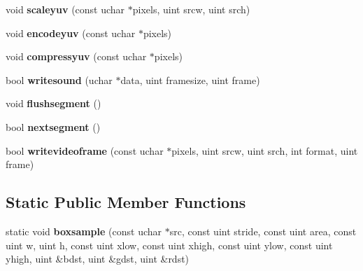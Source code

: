 \begin{DoxyCompactItemize}
\mbox{\label{structaviwriter_a031f24e197b329854736a38204544882}} 
void {\bfseries scaleyuv} (const uchar $\ast$pixels, uint srcw, uint srch)
\item 
\mbox{\label{structaviwriter_a8c2c0aed71f773b24e4eafa1e9420234}} 
void {\bfseries encodeyuv} (const uchar $\ast$pixels)
\item 
\mbox{\label{structaviwriter_adb2650291d6231a0c471a70aab343d13}} 
void {\bfseries compressyuv} (const uchar $\ast$pixels)
\item 
\mbox{\label{structaviwriter_a5b70b88a2f69554b1b53efc059bd57c1}} 
bool {\bfseries writesound} (uchar $\ast$data, uint framesize, uint frame)
\item 
\mbox{\label{structaviwriter_a9a0cfbeab22accb63886520706d04477}} 
void {\bfseries flushsegment} ()
\item 
\mbox{\label{structaviwriter_a5a15257b5a8ba6e5bafd8d9ff5117197}} 
bool {\bfseries nextsegment} ()
\item 
\mbox{\label{structaviwriter_aac0d7df09bf41c32323f1a1a4eaac806}} 
bool {\bfseries writevideoframe} (const uchar $\ast$pixels, uint srcw, uint srch, int format, uint frame)
\end{DoxyCompactItemize}
\subsection*{Static Public Member Functions}
\begin{DoxyCompactItemize}
\item 
\mbox{\label{structaviwriter_a4b5e2d67eeca2935ea90ccf425c8f4f6}} 
static void {\bfseries boxsample} (const uchar $\ast$src, const uint stride, const uint area, const uint w, uint h, const uint xlow, const uint xhigh, const uint ylow, const uint yhigh, uint \&bdst, uint \&gdst, uint \&rdst)
\end{DoxyCompactItemize}
